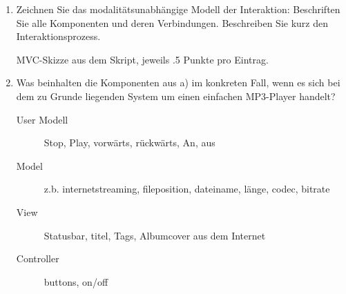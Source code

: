 	
\begin{enumerate}
\item Zeichnen Sie das modalitätsunabhängige Modell der Interaktion: Beschriften
Sie alle Komponenten und deren Verbindungen. Beschreiben Sie kurz den
Interaktionsprozess.

\begin{solution}{3}
MVC-Skizze aus dem Skript, jeweils .5 Punkte pro Eintrag.
\end{solution}

\item Was beinhalten die Komponenten aus a) im konkreten Fall, wenn es sich bei
dem zu Grunde liegenden System um einen einfachen MP3-Player handelt?

\begin{solution}{6}
\begin{description} 
\item[User Modell] Stop, Play, vorwärts, rückwärts, An, aus
\item[Model] z.b. internetstreaming, fileposition, dateiname, länge, codec,
bitrate
\item[View] Statusbar, titel, Tags, Albumcover aus dem Internet 
\item[Controller] buttons, on/off
\end{description}
\end{solution}

\end{enumerate}
